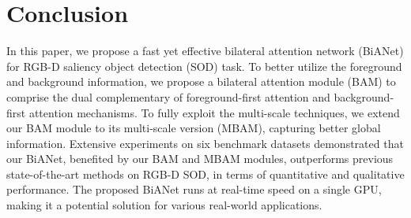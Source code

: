\documentclass[journal]{IEEEtran}
\begin{document}
\section{Conclusion}
\label{conclusion}


In this paper, we propose a fast yet effective bilateral attention network (BiANet) for RGB-D saliency object detection (SOD) task.
To better utilize the foreground and background information, we propose a bilateral attention module (BAM) to comprise the dual complementary of foreground-first attention and 
background-first attention mechanisms. 
To fully exploit the multi-scale techniques, we extend our BAM module to its multi-scale version (MBAM), capturing better global information. 
Extensive experiments on six benchmark datasets demonstrated that our BiANet, benefited by our BAM and MBAM modules, outperforms previous state-of-the-art methods on RGB-D SOD, in terms of quantitative and qualitative performance. 
The proposed BiANet runs at real-time speed on a single GPU, making it a potential solution for various real-world applications.





































\ifCLASSOPTIONcaptionsoff
  \newpage
\fi







 




\vfill
\end{document}
